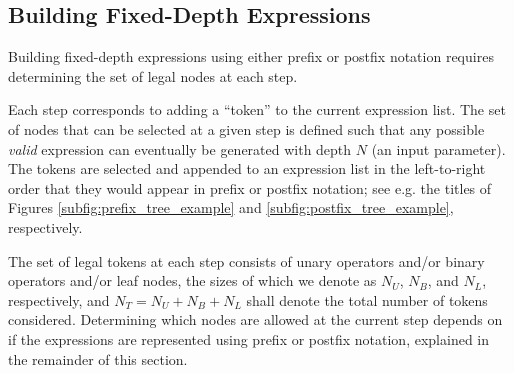 \documentclass[runningheads]{llncs}
\begin{document}
\subsection{Building Fixed-Depth Expressions}
Building fixed-depth expressions using either prefix or postfix notation requires determining the set of legal nodes at each step. 
\par Each step corresponds to adding a ``token'' to the current expression list. The set of nodes that can be selected at a given step is defined such that any possible \emph{valid} expression can eventually be generated with depth $N$ (an input parameter). The tokens are selected and appended to an expression list in the left-to-right order that they would appear in prefix or postfix notation; see e.g. the titles of Figures \ref{subfig:prefix_tree_example} and \ref{subfig:postfix_tree_example}, respectively. 
\par The set of legal tokens at each step consists of unary operators and/or binary operators and/or leaf nodes, the sizes of which we denote as $N_U$, $N_B$, and  $N_L$, respectively, and $N_{T} = N_U + N_B + N_L$ shall denote the total number of tokens considered. Determining which nodes are allowed at the current step depends on if the expressions are represented using prefix or postfix notation, explained in the remainder of this section.
\end{document}
